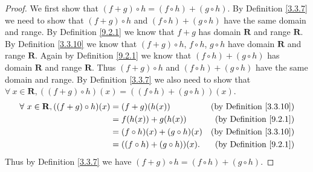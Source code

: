 \begin{proof}
    We first show that \((f + g) \circ h = (f \circ h) + (g \circ h)\).
    By Definition \ref{3.3.7} we need to show that \((f + g) \circ h\) and \((f \circ h) + (g \circ h)\) have the same domain and range.
    By Definition \ref{9.2.1} we know that \(f + g\) has domain \(\mathbf{R}\) and range \(\mathbf{R}\).
    By Definition \ref{3.3.10} we know that \((f + g) \circ h\), \(f \circ h\), \(g \circ h\) have domain \(\mathbf{R}\) and range \(\mathbf{R}\).
    Again by Definition \ref{9.2.1} we know that \((f \circ h) + (g \circ h)\) has domain \(\mathbf{R}\) and range \(\mathbf{R}\).
    Thus \((f + g) \circ h\) and \((f \circ h) + (g \circ h)\) have the same domain and range.
    By Definition \ref{3.3.7} we also need to show that \(\forall\ x \in \mathbf{R}, ((f + g) \circ h)(x) = ((f \circ h) + (g \circ h))(x)\).
    \begin{align*}
        \forall\ x \in \mathbf{R}, ((f + g) \circ h)(x) & = (f + g)(h(x))                   & \text{(by Definition \ref{3.3.10})} \\
                                                        & = f(h(x)) + g(h(x))               & \text{(by Definition \ref{9.2.1})}  \\
                                                        & = (f \circ h)(x) + (g \circ h)(x) & \text{(by Definition \ref{3.3.10})} \\
                                                        & = ((f \circ h) + (g \circ h))(x). & \text{(by Definition \ref{9.2.1})}
    \end{align*}
    Thus by Definition \ref{3.3.7} we have \((f + g) \circ h = (f \circ h) + (g \circ h)\).


\end{proof}

